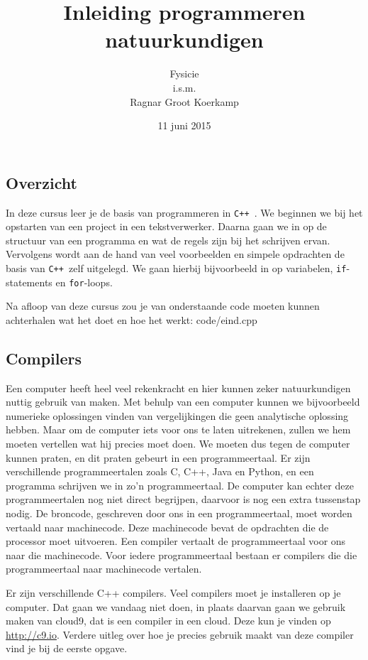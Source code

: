 \documentclass[12pt,a4paper]{article}
\title{Inleiding programmeren natuurkundigen}
\author{
Fysicie\\
i.s.m.\\
Ragnar Groot Koerkamp
}
\date{11 juni 2015}
\newcommand{\code}{}
\newcommand{\icode}{\lstinline}
\newcommand{\mono}{\texttt}
\newcommand{\cpp}{\mono{C++ }}
\begin{document}
 
\maketitle

\tableofcontents
\subsection{Overzicht}
In deze cursus leer je de basis van programmeren in \cpp. We beginnen we bij het opstarten van een project in een tekstverwerker. Daarna gaan we in op de structuur van een programma en wat de regels zijn bij het schrijven ervan. Vervolgens wordt aan de hand van veel voorbeelden en simpele opdrachten de basis van \cpp zelf	 uitgelegd. We gaan hierbij bijvoorbeeld in op variabelen, \icode{if}-statements en \icode{for}-loops.

Na afloop van deze cursus zou je van onderstaande code moeten kunnen achterhalen wat het doet en hoe het werkt:
\code{code/eind.cpp}
\subsection{Compilers}
Een computer heeft heel veel rekenkracht en hier kunnen zeker natuurkundigen nuttig gebruik van maken. Met behulp van een computer kunnen we bijvoorbeeld numerieke oplossingen vinden van vergelijkingen die geen analytische oplossing hebben. Maar om de computer iets voor ons te laten uitrekenen, zullen we hem moeten vertellen wat hij precies moet doen. We moeten dus tegen de computer kunnen praten, en dit praten gebeurt in een programmeertaal. Er zijn verschillende programmeertalen zoals C, C++, Java en Python, en een programma schrijven we in zo'n programmeertaal. De computer kan echter deze programmeertalen nog niet direct begrijpen, daarvoor is nog een extra tussenstap nodig. De broncode, geschreven door ons in een programmeertaal, moet worden vertaald naar machinecode. Deze machinecode bevat de opdrachten die de processor moet uitvoeren. Een compiler vertaalt de programmeertaal voor ons naar die machinecode. Voor iedere programmeertaal bestaan er compilers die die programmeertaal naar machinecode vertalen.

Er zijn verschillende C++ compilers. Veel compilers moet je installeren op je computer. Dat gaan we vandaag niet doen, in plaats daarvan gaan we gebruik maken van cloud9, dat is een compiler in een cloud. Deze kun je vinden op \url{http://c9.io}. Verdere uitleg over hoe je precies gebruik maakt van deze compiler vind je bij de eerste opgave.
\end{document}
